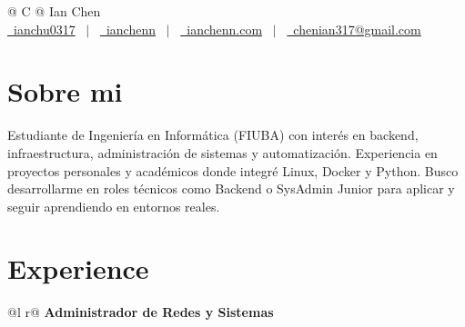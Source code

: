 \documentclass[a4paper,12pt]{article}
\begin{document}
\pagestyle{empty} 



\begin{tabularx}{\linewidth}{@{} C @{}}
\Huge{Ian Chen} \\[7.5pt]
\href{https://github.com/ianchu0317}{\raisebox{-0.05\height}\faGithub\ ianchu0317} \ $|$ \ 
\href{https://linkedin.com/in/ianchenn}{\raisebox{-0.05\height}\faLinkedin\ ianchenn} \ $|$ \ 
\href{https://ianchenn.com}{\raisebox{-0.05\height}\faGlobe \ ianchenn.com} \ $|$ \ 
\href{mailto:chenian317@gmail.com}{\raisebox{-0.05\height}\faEnvelope \ chenian317@gmail.com}  \\
\end{tabularx}


\section{Sobre mi}
Estudiante de Ingeniería en Informática (FIUBA) con interés en backend, infraestructura, administración de sistemas y automatización. Experiencia en proyectos personales y académicos donde integré Linux, Docker y Python. Busco desarrollarme en roles técnicos como Backend o SysAdmin Junior para aplicar y seguir aprendiendo en entornos reales.


\section{Experience}

\begin{tabularx}{\linewidth}{ @{}l r@{} }
\textbf{Administrador de Redes y Sistemas} \\[3.75pt]
  \\
\end{tabularx}
\end{document}
